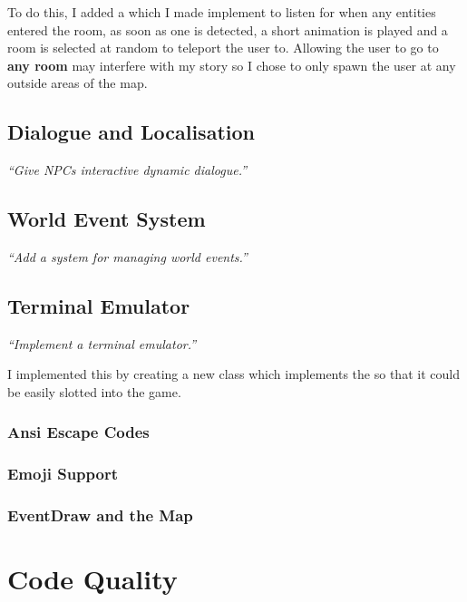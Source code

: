\documentclass{article}
\begin{document}
\begin{multicols}{2}
\begin{itemize}[leftmargin=*]
                    To do this, I added a  which I made implement  to listen for when any entities entered the room, as soon as one is detected, a short animation is played and a room is selected at random to teleport the user to. Allowing the user to go to \textbf{any room} may interfere with my story so I chose to only spawn the user at any outside areas of the map.
            \end{itemize}

            \subsection{Dialogue and Localisation}
            \textit{``Give NPCs interactive dynamic dialogue.''}

            \subsection{World Event System}
            \textit{``Add a system for managing world events.''}

            \subsection{Terminal Emulator}
            \textit{``Implement a terminal emulator.''}

            I implemented this by creating a new class  which implements the  so that it could be easily slotted into the game. 

            \subsubsection{Ansi Escape Codes}
            \subsubsection{Emoji Support}
            \subsubsection{EventDraw and the Map}

        \section{Code Quality}


\end{multicols}
\end{document}
